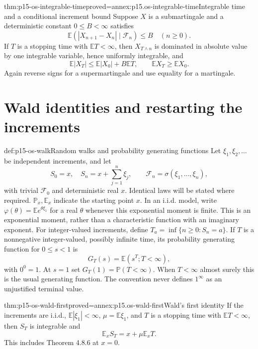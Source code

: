 \begin{hbtheorem}{thm:p15-os-integrable-time}{proved=annex:p15.os-integrable-time}{Integrable time and a conditional increment bound}
Suppose \(X\) is a submartingale and a deterministic constant
\(0\leq B<\infty\) satisfies
\[
 \mathbb E(|X_{n+1}-X_n|\mid\mathcal F_n)\leq B
                                    \quad(n\geq0).
 \]
If \(T\) is a stopping time with \(\mathbb ET<\infty\), then
\(X_{T\wedge n}\) is dominated in absolute value by one
integrable variable, hence uniformly integrable, and
\[
 \mathbb E|X_T|\leq\mathbb E|X_0|+B\mathbb ET,\qquad
 \mathbb EX_T\geq\mathbb EX_0.
 \]
Again reverse signs for a supermartingale and use equality for
a martingale.
\end{hbtheorem}

\section{Wald identities and restarting the increments}
\label{sec:p15-os-wald}

\begin{hbdefinition}{def:p15-os-walk}{Random walks and probability generating functions}
Let \(\xi_1,\xi_2,\ldots\) be independent increments, and let
\[
 S_0=x,\quad S_n=x+\sum_{j=1}^n\xi_j,\qquad
 \mathcal F_n=\sigma(\xi_1,\ldots,\xi_n),
 \]
with trivial \(\mathcal F_0\) and deterministic real \(x\).
Identical laws will be stated where required.
\(\mathbb P_x,\mathbb E_x\) indicate the starting point \(x\).
In an i.i.d. model, write
\(\varphi(\theta)=\mathbb Ee^{\theta\xi_1}\) for a real
\(\theta\) whenever this exponential moment is finite.
This is an exponential moment, rather than a characteristic
function with an imaginary exponent.
For integer-valued increments, define
\(T_a=\inf\{n\geq0:S_n=a\}\).
If \(T\) is a nonnegative integer-valued, possibly infinite
time, its probability generating function for \(0\leq s<1\) is
\[
 G_T(s)=\mathbb E(s^T;T<\infty),
 \]
with \(0^0=1\). At \(s=1\) set \(G_T(1)=\mathbb P(T<\infty)\).
When \(T<\infty\) almost surely this is the usual generating
function. The convention never defines \(1^\infty\) as an
unjustified terminal value.
\end{hbdefinition}

\begin{hbtheorem}{thm:p15-os-wald-first}{proved=annex:p15.os-wald-first}{Wald's first identity}
If the increments are i.i.d., \(\mathbb E|\xi_1|<\infty\),
\(\mu=\mathbb E\xi_1\), and \(T\) is a stopping time with
\(\mathbb ET<\infty\), then \(S_T\) is integrable and
\[
 \mathbb E_xS_T=x+\mu\mathbb E_xT.
 \]
This includes Theorem 4.8.6 at \(x=0\).
\end{hbtheorem}

